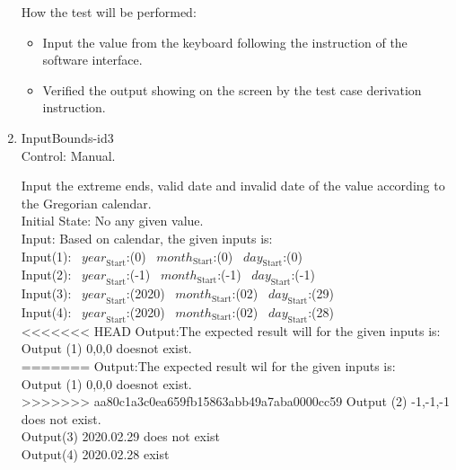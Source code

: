 \documentclass[12pt, titlepage]{article}
\begin{document}
\begin{enumerate}

How the test will be performed:

\begin{itemize} 

\item Input the value from the keyboard following the instruction of the
software interface.
\item Verified the output showing on the screen by the test case derivation
instruction.
\end{itemize}
\item{InputBounds-id3\\}
Control: Manual. 
  
 Input the extreme ends, valid date and invalid date of the value according to the Gregorian calendar. \\
Initial State: No any given value.\\

Input: Based on calendar, the given inputs is:\\ 
Input(1):
~$\mathit{year}_\text{Start}$:(0) ~$\mathit{month}_\text{Start}$:(0)
~$\mathit{day}_\text{Start}$:(0)\\  
Input(2):
~$\mathit{year}_\text{Start}$:(-1)
~$\mathit{month}_\text{Start}$:(-1) ~$\mathit{day}_\text{Start}$:(-1)\\

Input(3):
~$\mathit{year}_\text{Start}$:(2020)
~$\mathit{month}_\text{Start}$:(02) ~$\mathit{day}_\text{Start}$:(29)\\

Input(4):
~$\mathit{year}_\text{Start}$:(2020)
~$\mathit{month}_\text{Start}$:(02) ~$\mathit{day}_\text{Start}$:(28)\\


<<<<<<< HEAD
Output:The expected result will for the given inputs is:\\
Output (1) 0,0,0 doesnot exist.\\ 
=======
Output:The expected result wil  for the given inputs is:\\
Output (1) 0,0,0 doesnot  exist.\\ 
>>>>>>> aa80c1a3c0ea659fb15863abb49a7aba0000cc59
Output (2) -1,-1,-1 does not exist.\\
 Output(3) 2020.02.29 does not exist\\ 
 Output(4) 2020.02.28 exist\\ 


\end{enumerate}
\end{document}
